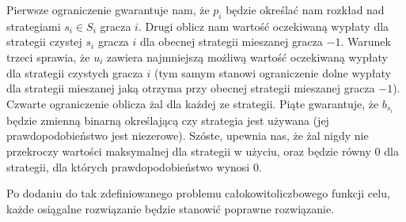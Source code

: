 \documentclass[polish]{standalone}
\begin{document}
Pierwsze ograniczenie gwarantuje nam, że $p_i$ będzie określać nam rozkład nad strategiami $s_i \in S_i$ gracza $i$.
Drugi oblicz nam wartość oczekiwaną wypłaty dla strategii czystej $s_i$ gracza $i$ dla obecnej strategii mieszanej
gracza $-1$. Warunek trzeci sprawia, że $u_i$ zawiera najmniejszą możliwą wartość oczekiwaną wypłaty dla strategii
czystych gracza $i$ (tym samym stanowi ograniczenie dolne wypłaty dla strategii mieszanej jaką otrzyma przy obecnej
strategii mieszanej gracza $-1$). Czwarte ograniczenie oblicza żal dla każdej ze strategii. Piąte gwarantuje, że
$b_{s_i}$ będzie zmienną binarną określającą czy strategia jest używana (jej prawdopodobieństwo jest niezerowe). Szóste,
upewnia nas, że żal nigdy nie przekroczy wartości maksymalnej dla strategii w użyciu, oraz będzie równy 0 dla strategii,
dla których prawdopodobieństwo wynosi 0.

Po dodaniu do tak zdefiniowanego problemu całokowitoliczbowego funkcji celu, każde osiągalne rozwiązanie będzie stanowić
poprawne rozwiązanie. \cite[str.~2]{SCG-NE}
\end{document}
